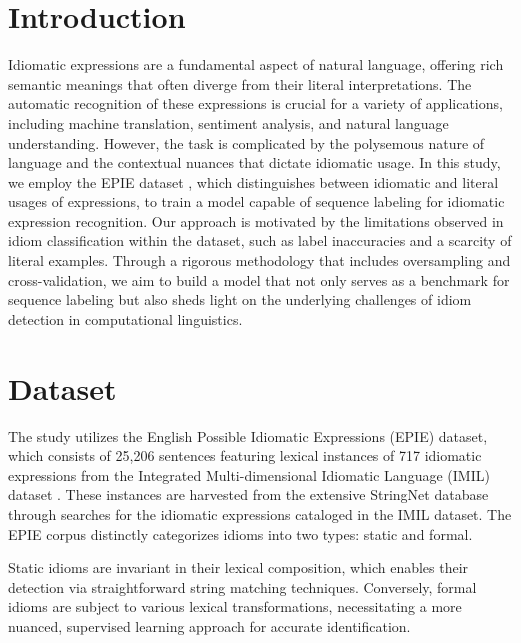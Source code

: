 \documentclass[conference]{IEEEtran}
\begin{document}
\section{Introduction}\label{sec:introduction}
Idiomatic expressions are a fundamental aspect of natural language, offering rich semantic meanings that often diverge from their literal interpretations. The automatic recognition of these expressions is crucial for a variety of applications, including machine translation, sentiment analysis, and natural language understanding. However, the task is complicated by the polysemous nature of language and the contextual nuances that dictate idiomatic usage. In this study, we employ the EPIE dataset , which distinguishes between idiomatic and literal usages of expressions, to train a model capable of sequence labeling for idiomatic expression recognition. Our approach is motivated by the limitations observed in idiom classification within the dataset, such as label inaccuracies and a scarcity of literal examples. Through a rigorous methodology that includes oversampling and cross-validation, we aim to build a model that not only serves as a benchmark for sequence labeling but also sheds light on the underlying challenges of idiom detection in computational linguistics.

\section{Dataset}

The study utilizes the English Possible Idiomatic Expressions (EPIE) dataset, which consists of 25,206 sentences featuring lexical instances of 717 idiomatic expressions from the Integrated Multi-dimensional Idiomatic Language (IMIL) dataset . These instances are harvested from the extensive StringNet database  through searches for the idiomatic expressions cataloged in the IMIL dataset. The EPIE corpus distinctly categorizes idioms into two types: static and formal.

Static idioms are invariant in their lexical composition, which enables their detection via straightforward string matching techniques. Conversely, formal idioms are subject to various lexical transformations, necessitating a more nuanced, supervised learning approach for accurate identification.
\end{document}
